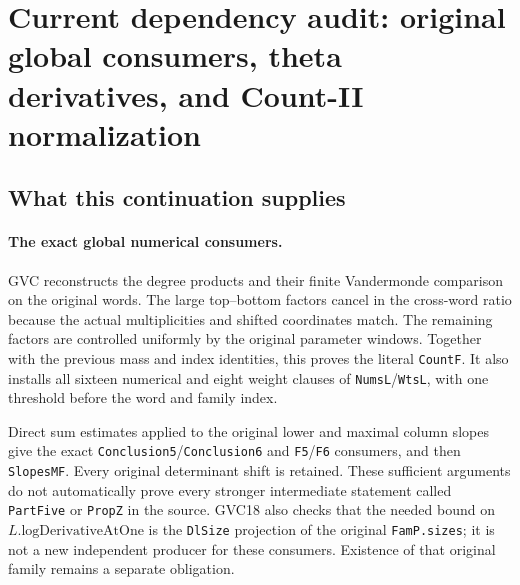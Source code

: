 \section{Current dependency audit: original global consumers, theta derivatives, and Count-II normalization}
\label{sec:dependency-audit-v34}


\subsection{What this continuation supplies}

\paragraph{The exact global numerical consumers.}
GVC reconstructs the degree products and their finite Vandermonde
comparison on the original words. The large top--bottom factors
cancel in the cross-word ratio because the actual multiplicities
and shifted coordinates match. The remaining factors are controlled
uniformly by the original parameter windows. Together with the
previous mass and index identities, this proves the literal
\texttt{CountF}. It also installs all sixteen numerical and eight
weight clauses of \texttt{NumsL}/\texttt{WtsL}, with one threshold
before the word and family index.

Direct sum estimates applied to the original lower and maximal
column slopes give the exact \texttt{Conclusion5}/\texttt{Conclusion6}
and \texttt{F5}/\texttt{F6} consumers, and then
\texttt{SlopesMF}. Every original determinant shift is retained.
These sufficient arguments do not automatically prove every stronger
intermediate statement called \texttt{PartFive} or \texttt{PropZ}
in the source. GVC18 also checks that the needed bound on
\(L.\mathrm{logDerivativeAtOne}\) is the \texttt{DlSize} projection
of the original \texttt{FamP.sizes}; it is not a new independent
producer for these consumers. Existence of that original family
remains a separate obligation.

